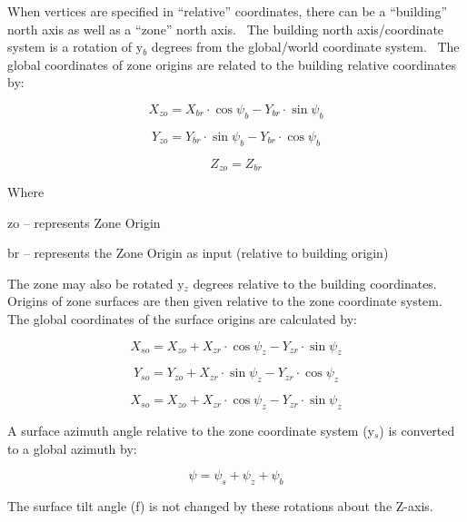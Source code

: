 When vertices are specified in ``relative'' coordinates, there can be a ``building'' north axis as well as a ``zone'' north axis.~ The building north axis/coordinate system is a rotation of y\(_{b}\) degrees from the global/world coordinate system.~ The global coordinates of zone origins are related to the building relative coordinates by:

\begin{equation}
{X_{zo}} = {X_{br}}\cdot \cos {\psi_b} - {Y_{br}}\cdot \sin {\psi_b}
\end{equation}

\begin{equation}
{Y_{zo}} = {Y_{br}}\cdot \sin {\psi_b} - {Y_{br}}\cdot \cos {\psi_b}
\end{equation}

\begin{equation}
{Z_{zo}} = {Z_{br}}
\end{equation}

Where

zo -- represents Zone Origin

br -- represents the Zone Origin as input (relative to building origin)

The zone may also be rotated y\(_{z}\) degrees relative to the building coordinates. Origins of zone surfaces are then given relative to the zone coordinate system. The global coordinates of the surface origins are calculated by:

\begin{equation}
{X_{so}} = {X_{zo}} + {X_{zr}}\cdot \cos {\psi_z} - {Y_{zr}}\cdot \sin {\psi_z}
\end{equation}

\begin{equation}
{Y_{so}} = {Y_{zo}} + {X_{zr}}\cdot \sin {\psi_z} - {Y_{zr}}\cdot \cos {\psi_z}
\end{equation}

\begin{equation}
{X_{so}} = {X_{zo}} + {X_{zr}}\cdot \cos {\psi_z} - {Y_{zr}}\cdot \sin {\psi_z}
\end{equation}

A surface azimuth angle relative to the zone coordinate system (y\(_{s}\)) is converted to a global azimuth by:

\begin{equation}
\psi  = {\psi_s} + {\psi_z} + {\psi_b}
\end{equation}

The surface tilt angle (f) is not changed by these rotations about the Z-axis.

